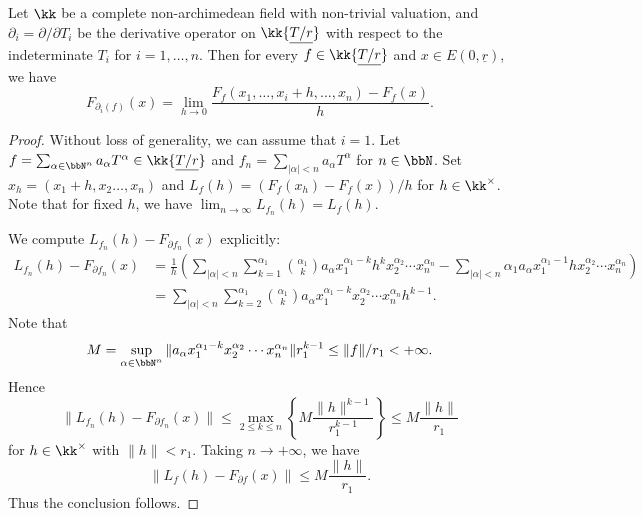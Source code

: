     \begin{proposition}\label{prop:formal_derivative_is_the_derivative_of_functions}
        Let \(\kk\) be a complete non-archimedean field with non-trivial valuation, and \(\partial_i = \partial/\partial T_i\) be the derivative operator on \(\kk\{ \underline{T/r} \} \) with respect to the indeterminate \(T_i\) for \(i = 1, \ldots, n\).
        Then for every \(f \in \kk\{ \underline{T/r} \} \) and \(x \in E(0,\underline{r})\), we have
        \[ F_{\partial_i(f)}(x) = \lim_{h \to 0} \frac{F_f(x_1, \ldots, x_i + h, \ldots, x_n) - F_f(x)}{h}. \]
    \end{proposition}
    \begin{proof}
        Without loss of generality, we can assume that \(i=1\).
        Let \(f = \sum_{\alpha \in \bbN^n} a_\alpha T^\alpha \in \kk\{ \underline{T/r} \} \) and \(f_n = \sum_{|\alpha| < n} a_\alpha T^\alpha\) for \(n \in \bbN\).
        Set \(x_h = (x_1 + h, x_2 \ldots, x_n)\) and \(L_f(h) = (F_f(x_h) - F_f(x))/h\) for \(h \in \kk^\times\).
        Note that for fixed \(h\), we have \(\lim_{n\to \infty}L_{f_n}(h) = L_f(h)\).

        We compute \(L_{f_n}(h) - F_{\partial f_n}(x)\) explicitly:
        \begin{align*}
            L_{f_n}(h) - F_{\partial f_n}(x) &= \frac{1}{h}\left(\sum_{|\alpha| < n}\sum_{k=1}^{\alpha_1} \binom{\alpha_1}{k}  a_\alpha x_1^{\alpha_1 - k} h^{k} x_2^{\alpha_2} \cdots x_n^{\alpha_n} - \sum_{|\alpha| < n} \alpha_1 a_\alpha x_1^{\alpha_1 - 1} h x_2^{\alpha_2} \cdots x_n^{\alpha_n} \right) \\
            &= \sum_{|\alpha| < n} \sum_{k=2}^{\alpha_1} \binom{\alpha_1}{k} a_\alpha x_1^{\alpha_1 - k} x_2^{\alpha_2} \cdots x_n^{\alpha_n} h^{k-1}.
        \end{align*}
        Note that 
        \[ M = \sup_{\alpha \in \bbN^n} \|a_\alpha x_1^{\alpha_1 - k} x_2^{\alpha_2} \cdots x_n^{\alpha_n}\| r_1^{k-1} \leq \|f\|/r_1 < +\infty. \]
        Hence
        \[ \|L_{f_n}(h) - F_{\partial f_n}(x)\| \leq \max_{2 \leq k\leq n}\left\{ M \frac{\|h\|^{k-1}}{r_1^{k-1}} \right\} \leq M \frac{\|h\|}{r_1} \]
        for \(h \in \kk^\times\) with \(\|h\| < r_1\).
        Taking \(n \to +\infty\), we have
        \[ \|L_f(h) - F_{\partial f}(x)\| \leq M \frac{\|h\|}{r_1}. \]
        Thus the conclusion follows.
    \end{proof}


